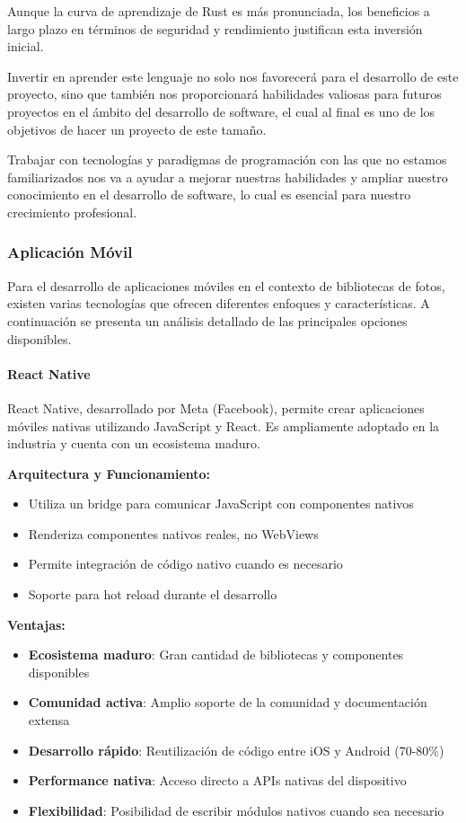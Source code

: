 Aunque la curva de aprendizaje de Rust es más pronunciada, los beneficios a largo plazo en términos de seguridad y rendimiento justifican esta inversión inicial.

Invertir en aprender este lenguaje no solo nos favorecerá para el desarrollo de este proyecto, sino que también nos proporcionará habilidades valiosas para futuros proyectos en el ámbito del desarrollo de software, el cual al final es uno de los objetivos de hacer un proyecto de este tamaño.

Trabajar con tecnologías y paradigmas de programación con las que no estamos familiarizados nos va a ayudar a mejorar nuestras habilidades y ampliar nuestro conocimiento en el desarrollo de software, lo cual es esencial para nuestro crecimiento profesional.

\subsubsection{Aplicación Móvil}

Para el desarrollo de aplicaciones móviles en el contexto de bibliotecas de fotos, existen varias tecnologías que ofrecen diferentes enfoques y características. A continuación se presenta un análisis detallado de las principales opciones disponibles.

\paragraph{React Native}

React Native, desarrollado por Meta (Facebook), permite crear aplicaciones móviles nativas utilizando JavaScript y React. Es ampliamente adoptado en la industria y cuenta con un ecosistema maduro.

\textbf{Arquitectura y Funcionamiento:}
\begin{itemize}
    \item Utiliza un bridge para comunicar JavaScript con componentes nativos
    \item Renderiza componentes nativos reales, no WebViews
    \item Permite integración de código nativo cuando es necesario
    \item Soporte para hot reload durante el desarrollo
\end{itemize}

\textbf{Ventajas:}
\begin{itemize}
    \item \textbf{Ecosistema maduro}: Gran cantidad de bibliotecas y componentes disponibles
    \item \textbf{Comunidad activa}: Amplio soporte de la comunidad y documentación extensa
    \item \textbf{Desarrollo rápido}: Reutilización de código entre iOS y Android (70-80\%)
    \item \textbf{Performance nativa}: Acceso directo a APIs nativas del dispositivo
    \item \textbf{Flexibilidad}: Posibilidad de escribir módulos nativos cuando sea necesario
\end{itemize}


